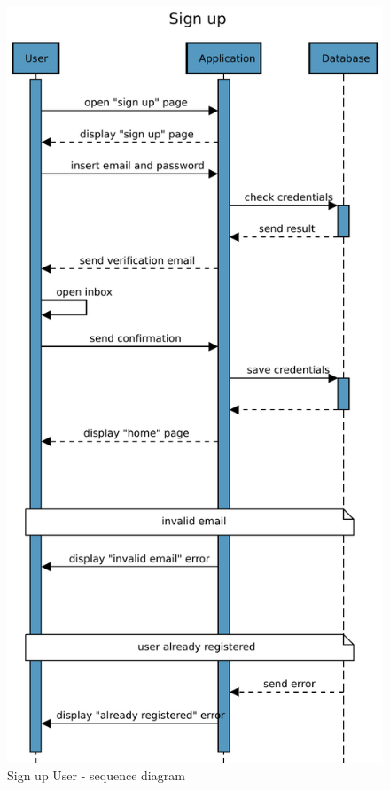 \begin{figure}[H]
    \centering
    \includegraphics[scale=0.75]{Images/Sequence diagrams/User - sign up.pdf}

    \caption{Sign up User - sequence diagram}
    \label{fig:fig:seq_diag_sign_up}
\end{figure}

